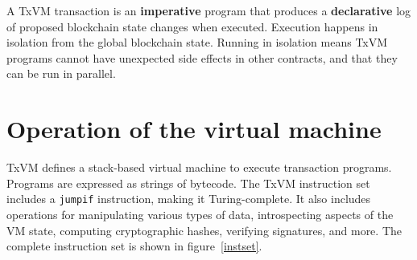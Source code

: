 \documentclass{article}
\newcommand{\txvm}{TxVM}
\begin{document}
A \txvm{} transaction is an \textbf{imperative} program that produces
a \textbf{declarative} log of proposed blockchain state changes when
executed. Execution happens in isolation from the global blockchain
state. Running in isolation means \txvm{} programs cannot have
unexpected side effects in other contracts, and that they can be run
in parallel.

\section{Operation of the virtual machine}

\txvm{} defines a stack-based virtual machine to execute transaction
programs. Programs are expressed as strings of bytecode. The \txvm{}
instruction set includes a \texttt{jumpif} instruction, making it
Turing-complete. It also includes operations for manipulating various
types of data, introspecting aspects of the VM state, computing
cryptographic hashes, verifying signatures, and more. The complete
instruction set is shown in figure~\ref{instset}.
\end{document}
